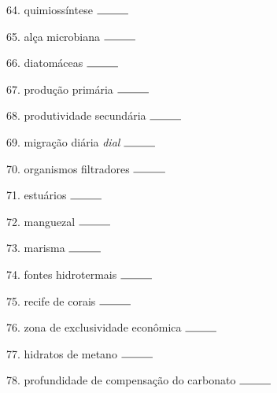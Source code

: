 \documentclass[a4paper,10pt]{article}
\begin{document}
\begin{multicols}{2}
64. quimiossíntese $\rule{1cm}{0.15mm}$

65. alça microbiana $\rule{1cm}{0.15mm}$

66. diatomáceas $\rule{1cm}{0.15mm}$

67. produção primária $\rule{1cm}{0.15mm}$

68. produtividade secundária $\rule{1cm}{0.15mm}$

69. migração diária {\it dial} $\rule{1cm}{0.15mm}$

70. organismos filtradores $\rule{1cm}{0.15mm}$

71. estuários $\rule{1cm}{0.15mm}$

72. manguezal $\rule{1cm}{0.15mm}$

73. marisma $\rule{1cm}{0.15mm}$

74. fontes hidrotermais $\rule{1cm}{0.15mm}$

75. recife de corais $\rule{1cm}{0.15mm}$

76. zona de exclusividade econômica $\rule{1cm}{0.15mm}$

77. hidratos de metano $\rule{1cm}{0.15mm}$

78. profundidade de compensação do carbonato $\rule{1cm}{0.15mm}$


\end{multicols}






\end{document}
